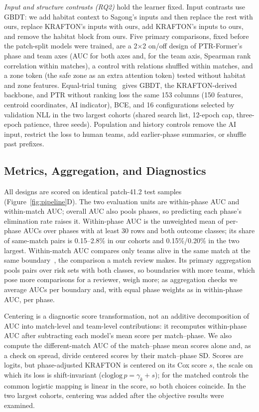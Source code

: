 \documentclass[sigconf,anonymous,nonacm]{acmart}
\begin{document}
\emph{Input and structure contrasts (RQ2)} hold the learner fixed. Input contrasts use GBDT: we add habitat context to Sagong's inputs and then replace the rest with ours, replace KRAFTON's inputs with ours, add KRAFTON's inputs to ours, and remove the habitat block from ours. Five primary comparisons, fixed before the patch-split models were trained, are a 2$\times$2 on/off design of PTR-Former's phase and team axes (AUC for both axes and, for the team axis, Spearman rank correlation within matches), a control with relations shuffled within matches, and a zone token (the safe zone as an extra attention token) tested without habitat and zone features. Equal-trial tuning~\cite{Bergstra12} gives GBDT, the KRAFTON-derived backbone, and PTR without ranking loss the same 153 columns (150 features, centroid coordinates, AI indicator), BCE, and 16 configurations selected by validation NLL in the two largest cohorts (shared search list, 12-epoch cap, three-epoch patience, three seeds). Population and history controls remove the AI input, restrict the loss to human teams, add earlier-phase summaries, or shuffle past prefixes.

\subsection{Metrics, Aggregation, and Diagnostics}
\label{sec:method:units}
All designs are scored on identical patch-41.2 test samples (Figure~\ref{fig:pipeline}D). The two evaluation units are within-phase AUC and within-match AUC; overall AUC also pools phases, so predicting each phase's elimination rate raises it. Within-phase AUC is the unweighted mean of per-phase AUCs over phases with at least 30 rows and both outcome classes; its share of same-match pairs is 0.15--2.8\% in our cohorts and 0.15\%/0.20\% in the two largest. Within-match AUC compares only teams alive in the same match at the same boundary~\cite{HeagertyZheng05,vanKlaveren14}, the comparison a match review makes. Its primary aggregation pools pairs over risk sets with both classes, so boundaries with more teams, which pose more comparisons for a reviewer, weigh more; as aggregation checks we average AUCs per boundary and, with equal phase weights as in within-phase AUC, per phase.

Centering is a diagnostic score transformation, not an additive decomposition of AUC into match-level and team-level contributions: it recomputes within-phase AUC after subtracting each model's mean score per match--phase. We also compute the different-match AUC of the match--phase mean scores alone and, as a check on spread, divide centered scores by their match--phase SD. Scores are logits, but phase-adjusted KRAFTON is centered on its Cox score $s$, the scale on which its loss is shift-invariant ($\mathrm{cloglog}\,p=\gamma_k+s$); for the matched controls the common logistic mapping is linear in the score, so both choices coincide. In the two largest cohorts, centering was added after the objective results were examined.
\end{document}
